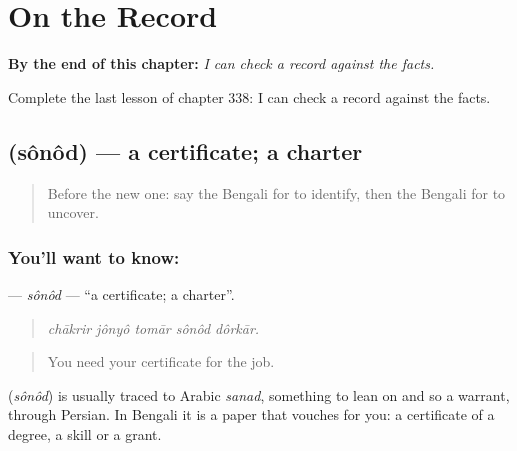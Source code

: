 
\chapter{On the Record}
\label{ch:bn-on-the-record}

\begin{chapteropening}
\textbf{By the end of this chapter:} \emph{I can check a record against the facts.}

Complete the last lesson of chapter 338: I can check a record against the facts.
\end{chapteropening}

\section[\texorpdfstring{\bn{সনদ} (sônôd)}{সনদ (sônôd)}]{ (sônôd) — a certificate; a charter}

\label{lesson:BN-C338-sonod}



\begin{quote}
Before the new one: say the Bengali for to identify, then the Bengali for to uncover.
\end{quote}

\subsection*{You'll want to know: }
\textbf{} — \emph{sônôd} — \textquotedblleft{}a certificate; a charter\textquotedblright{}.

\begin{quote}
    
\end{quote}

\begin{quote}
\emph{chākrir jônyô tomār sônôd dôrkār.}
\end{quote}

\begin{quote}
You need your certificate for the job.
\end{quote}

\begin{cousinweb}
\textbf{} (\emph{sônôd}) is usually traced to Arabic \emph{sanad}, something to lean on and so a warrant, through Persian. In Bengali it is a paper that vouches for you: a certificate of a degree, a skill or a grant.
\end{cousinweb}

